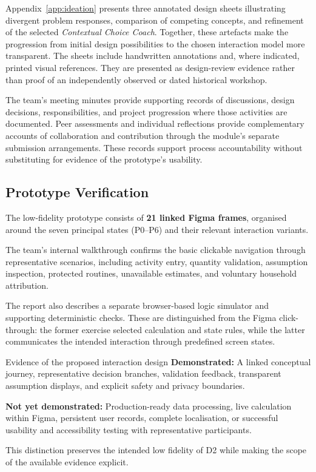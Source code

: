 \documentclass[12pt,a4paper]{article}
\begin{document}
Appendix~\ref{app:ideation} presents three annotated design sheets illustrating divergent problem responses, comparison of competing concepts, and refinement of the selected \textit{Contextual Choice Coach}. Together, these artefacts make the progression from initial design possibilities to the chosen interaction model more transparent. The sheets include handwritten annotations and, where indicated, printed visual references. They are presented as design-review evidence rather than proof of an independently observed or dated historical workshop.

The team's meeting minutes provide supporting records of discussions, design decisions, responsibilities, and project progression where those activities are documented. Peer assessments and individual reflections provide complementary accounts of collaboration and contribution through the module's separate submission arrangements. These records support process accountability without substituting for evidence of the prototype's usability.

\subsection{Prototype Verification}

The low-fidelity prototype consists of \textbf{21 linked Figma frames}, organised around the seven principal states (P0--P6) and their relevant interaction variants.

The team's internal walkthrough confirms the basic clickable navigation through representative scenarios, including activity entry, quantity validation, assumption inspection, protected routines, unavailable estimates, and voluntary household attribution.

The report also describes a separate browser-based logic simulator and supporting deterministic checks. These are distinguished from the Figma click-through: the former exercise selected calculation and state rules, while the latter communicates the intended interaction through predefined screen states.

\begin{insightbox}{Evidence of the proposed interaction design}
\textbf{Demonstrated:} A linked conceptual journey, representative decision branches, validation feedback, transparent assumption displays, and explicit safety and privacy boundaries.

\textbf{Not yet demonstrated:} Production-ready data processing, live calculation within Figma, persistent user records, complete localisation, or successful usability and accessibility testing with representative participants.

This distinction preserves the intended low fidelity of D2 while making the scope of the available evidence explicit.
\end{insightbox}
\end{document}
